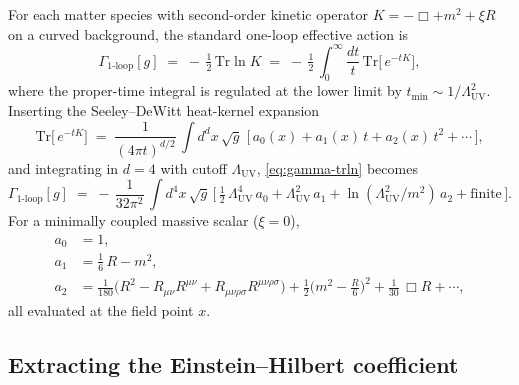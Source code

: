 \documentclass[11pt]{article}
\newcommand{\Tr}{\mathrm{Tr}}
\begin{document}
For each matter species with second-order kinetic operator
$K = -\Box + m^2 + \xi R$ on a curved background, the standard
one-loop effective action is~\cite{vassilevich2003}
\begin{equation}
  \Gamma_{\text{1-loop}}[g]
   \;=\;
   -\,\tfrac{1}{2}\,\Tr \ln K
   \;=\;
   -\,\tfrac{1}{2}\,\int_0^\infty \frac{dt}{t}\,\Tr\!\bigl[\,e^{-t K}\bigr],
  \label{eq:gamma-trln}
\end{equation}
where the proper-time integral is regulated at the lower limit by
$t_{\min} \sim 1/\Lambda_{\mathrm{UV}}^2$.  Inserting the
Seeley--DeWitt heat-kernel expansion
\begin{equation}
  \Tr\!\bigl[\,e^{-t K}\bigr]
   \;=\;
   \frac{1}{(4\pi t)^{d/2}}\,
   \int d^d x\,\sqrt{g}\;\bigl[\,a_0(x) + a_1(x)\,t + a_2(x)\,t^2 + \cdots\,\bigr],
  \label{eq:hk-expansion}
\end{equation}
and integrating in $d = 4$ with cutoff $\Lambda_{\mathrm{UV}}$,
\eqref{eq:gamma-trln} becomes
\begin{equation}
  \Gamma_{\text{1-loop}}[g]
   \;=\;
   -\,\frac{1}{32\pi^2}\,\int d^4 x\,\sqrt{g}\,
   \Big[\,
       \tfrac{1}{2}\,\Lambda_{\mathrm{UV}}^4\,a_0
     + \Lambda_{\mathrm{UV}}^2\,a_1
     + \ln(\Lambda_{\mathrm{UV}}^2/m^2)\,a_2
     + \mathrm{finite}
   \,\Big].
  \label{eq:gamma-cutoff}
\end{equation}
For a minimally coupled massive scalar ($\xi = 0$),
\begin{align}
  a_0 &= 1, \\
  a_1 &= \tfrac{1}{6}\,R - m^2, \\
  a_2 &= \tfrac{1}{180}\bigl(R^2 - R_{\mu\nu} R^{\mu\nu} + R_{\mu\nu\rho\sigma} R^{\mu\nu\rho\sigma}\bigr)
       + \tfrac{1}{2}\bigl(m^2 - \tfrac{R}{6}\bigr)^2
       + \tfrac{1}{30}\,\Box R + \cdots,
\end{align}
all evaluated at the field point $x$.

\subsection{Extracting the Einstein--Hilbert coefficient}
\end{document}
